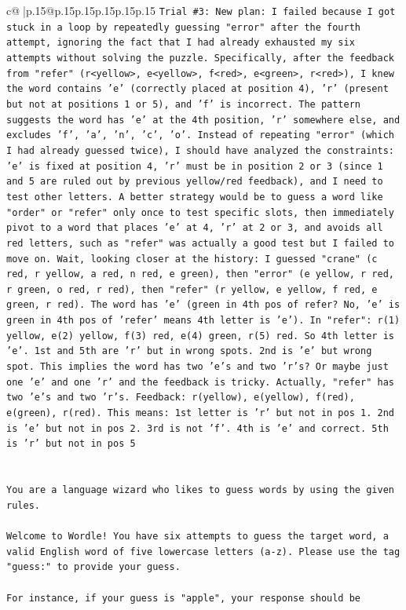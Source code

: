 \documentclass{article}
\begin{document}
{\begin{supertabular}{c@{$\;$}|p{.15\linewidth}@{}p{.15\linewidth}p{.15\linewidth}p{.15\linewidth}p{.15\linewidth}p{.15\linewidth}}
{{{\texttt{Trial \#3: New plan: I failed because I got stuck in a loop by repeatedly guessing "error" after the fourth attempt, ignoring the fact that I had already exhausted my six attempts without solving the puzzle. Specifically, after the feedback from "refer" (r<yellow>, e<yellow>, f<red>, e<green>, r<red>), I knew the word contains 'e' (correctly placed at position 4), 'r' (present but not at positions 1 or 5), and 'f' is incorrect. The pattern suggests the word has 'e' at the 4th position, 'r' somewhere else, and excludes 'f', 'a', 'n', 'c', 'o'. Instead of repeating "error" (which I had already guessed twice), I should have analyzed the constraints: 'e' is fixed at position 4, 'r' must be in position 2 or 3 (since 1 and 5 are ruled out by previous yellow/red feedback), and I need to test other letters. A better strategy would be to guess a word like "order" or "refer" only once to test specific slots, then immediately pivot to a word that places 'e' at 4, 'r' at 2 or 3, and avoids all red letters, such as "refer" was actually a good test but I failed to move on. Wait, looking closer at the history: I guessed "crane" (c red, r yellow, a red, n red, e green), then "error" (e yellow, r red, r green, o red, r red), then "refer" (r yellow, e yellow, f red, e green, r red). The word has 'e' (green in 4th pos of refer? No, 'e' is green in 4th pos of 'refer' means 4th letter is 'e'). In "refer": r(1) yellow, e(2) yellow, f(3) red, e(4) green, r(5) red. So 4th letter is 'e'. 1st and 5th are 'r' but in wrong spots. 2nd is 'e' but wrong spot. This implies the word has two 'e's and two 'r's? Or maybe just one 'e' and one 'r' and the feedback is tricky. Actually, "refer" has two 'e's and two 'r's. Feedback: r(yellow), e(yellow), f(red), e(green), r(red). This means: 1st letter is 'r' but not in pos 1. 2nd is 'e' but not in pos 2. 3rd is not 'f'. 4th is 'e' and correct. 5th is 'r' but not in pos 5} \\
\\ 
\\ 
\texttt{You are a language wizard who likes to guess words by using the given rules.} \\
\\ 
\texttt{Welcome to Wordle! You have six attempts to guess the target word, a valid English word of five lowercase letters (a{-}z). Please use the tag "guess:" to provide your guess.} \\
\\ 
\texttt{For instance, if your guess is "apple", your response should be} \\
}}}
\end{supertabular}}
\end{document}
